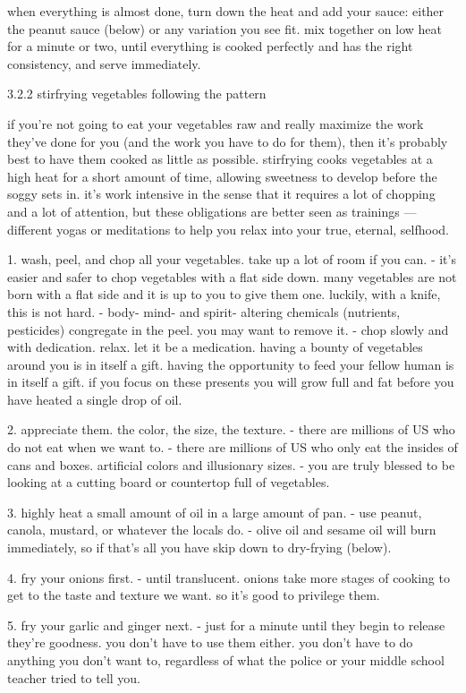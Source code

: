when everything is almost done, turn down the heat and add your sauce: either the peanut sauce (below) or any variation you see fit. mix together on low heat for a minute or two, until everything is cooked perfectly and has the right consistency, and serve immediately.

3.2.2  stirfrying vegetables following the pattern

if you're not going to eat your vegetables raw and really maximize the work they've done for you (and the work you have to do for them), then it's probably best to have them cooked as little as possible. stirfrying cooks vegetables at a high heat for a short amount of time, allowing sweetness to develop before the soggy sets in. it's work intensive in the sense that it requires a lot of chopping and a lot of attention, but these obligations are better seen as trainings --- different yogas or meditations to help you relax into your true, eternal, selfhood.

1. wash, peel, and chop all your vegetables. take up a lot of room if you can.
	- it's easier and safer to chop vegetables with a flat side down. many vegetables are not born with a flat side and it is up to you to give them one. luckily, with a knife, this is not hard.
	- body- mind- and spirit- altering chemicals (nutrients, pesticides) congregate in the peel. you may want to remove it.
	- chop slowly and with dedication. relax. let it be a medication. having a bounty of vegetables around you is in itself a gift. having the opportunity to feed your fellow human is in itself a gift. if you focus on these presents you will grow full and fat before you have heated a single drop of oil.

2. appreciate them. the color, the size, the texture.
	- there are millions of US who do not eat when we want to.
	- there are millions of US who only eat the insides of cans and boxes. artificial colors and illusionary sizes.
	- you are truly blessed to be looking at a cutting board or countertop full of vegetables.

3. highly heat a small amount of oil in a large amount of pan.
	- use peanut, canola, mustard, or whatever the locals do.
	- olive oil and sesame oil will burn immediately, so if that's all you have skip down to dry-frying (below).

4. fry your onions first.
	- until translucent. onions take more stages of cooking to get to the taste and texture we want. so it's good to privilege them.

5. fry your garlic and ginger next.
	- just for a minute until they begin to release they're goodness. you don't have to use them either. you don't have to do anything you don't want to, regardless of what the police or your middle school teacher tried to tell you.


